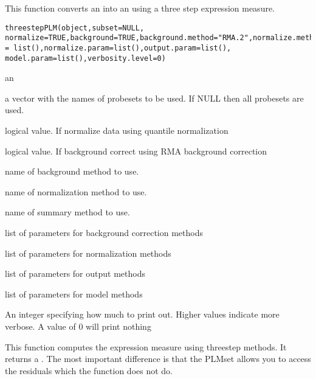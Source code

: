 \begin{Description}\relax
This function converts an  into an
 using a three step expression measure.
\end{Description}
\begin{Usage}
\begin{verbatim}
threestepPLM(object,subset=NULL, normalize=TRUE,background=TRUE,background.method="RMA.2",normalize.method="quantile",summary.method="median.polish",background.param = list(),normalize.param=list(),output.param=list(), model.param=list(),verbosity.level=0)
\end{verbatim}
\end{Usage}
\begin{Arguments}
\begin{ldescription}
\item[\code{object}] an 
\item[\code{subset}] a vector with the names of probesets to be used. If NULL
then all probesets are used.
\item[\code{normalize}] logical value. If  normalize data using
quantile normalization
\item[\code{background}] logical value. If  background correct
using RMA background correction
\item[\code{background.method}] name of background method to use.
\item[\code{normalize.method}] name of normalization method to use.
\item[\code{summary.method}] name of summary method to use.
\item[\code{background.param}] list of parameters for background correction methods
\item[\code{normalize.param}] list of parameters for normalization methods
\item[\code{output.param}] list of parameters for output methods
\item[\code{model.param}] list of parameters for model methods
\item[\code{verbosity.level}] An integer specifying how much to print
out. Higher values indicate more verbose. A value of 0 will print nothing
\end{ldescription}
\end{Arguments}
\begin{Details}\relax
This function computes the expression measure using threestep
methods. It returns a . The most important
difference is that the PLMset allows you to access the residuals
which the  function does not do.
\end{Details}
